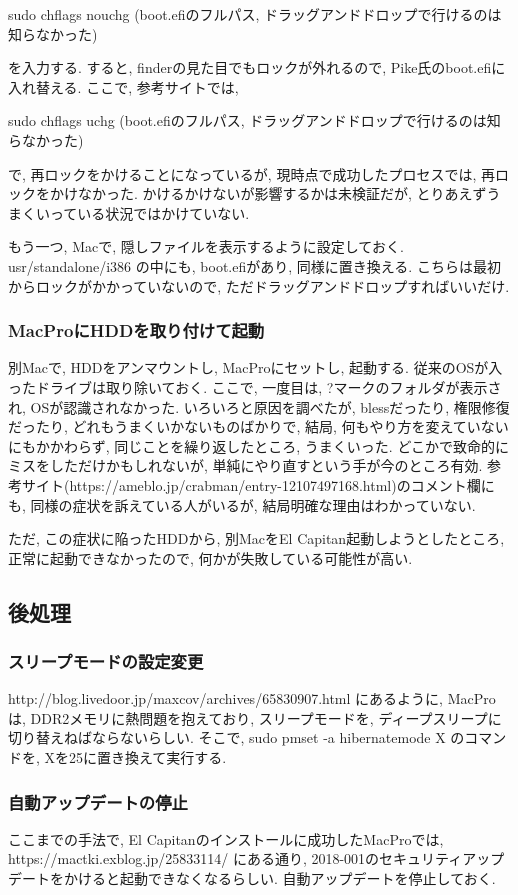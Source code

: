 \documentclass{jsarticle}
\begin{document}
sudo chflags nouchg (boot.efiのフルパス, ドラッグアンドドロップで行けるのは知らなかった)

を入力する. 
すると, finderの見た目でもロックが外れるので, Pike氏のboot.efiに入れ替える. 
ここで, 参考サイトでは, 

sudo chflags uchg (boot.efiのフルパス, ドラッグアンドドロップで行けるのは知らなかった)

で, 再ロックをかけることになっているが, 現時点で成功したプロセスでは, 再ロックをかけなかった. 
かけるかけないが影響するかは未検証だが, とりあえずうまくいっている状況ではかけていない. 

もう一つ, Macで, 隠しファイルを表示するように設定しておく. 
usr/standalone/i386 の中にも, boot.efiがあり, 同様に置き換える. こちらは最初からロックがかかっていないので, ただドラッグアンドドロップすればいいだけ. 

\subsubsection{MacProにHDDを取り付けて起動}
別Macで, HDDをアンマウントし, MacProにセットし, 起動する. 従来のOSが入ったドライブは取り除いておく. 
ここで, 一度目は, ?マークのフォルダが表示され, OSが認識されなかった. いろいろと原因を調べたが, blessだったり, 権限修復だったり, どれもうまくいかないものばかりで, 
結局, 何もやり方を変えていないにもかかわらず, 同じことを繰り返したところ, うまくいった. どこかで致命的にミスをしただけかもしれないが, 
単純にやり直すという手が今のところ有効. 参考サイト(https://ameblo.jp/crabman/entry-12107497168.html)のコメント欄にも, 同様の症状を訴えている人がいるが, 結局明確な理由はわかっていない. 

ただ, この症状に陥ったHDDから, 別MacをEl Capitan起動しようとしたところ, 正常に起動できなかったので, 何かが失敗している可能性が高い. 

\subsection{後処理}
\subsubsection{スリープモードの設定変更}
http://blog.livedoor.jp/maxcov/archives/65830907.html にあるように, MacProは, DDR2メモリに熱問題を抱えており, スリープモードを, ディープスリープに切り替えねばならないらしい. そこで, 
sudo pmset -a hibernatemode X のコマンドを, Xを25に置き換えて実行する. 

\subsubsection{自動アップデートの停止}
ここまでの手法で, El Capitanのインストールに成功したMacProでは, https://mactki.exblog.jp/25833114/ にある通り, 2018-001のセキュリティアップデートをかけると起動できなくなるらしい. 自動アップデートを停止しておく. 
\end{document}
